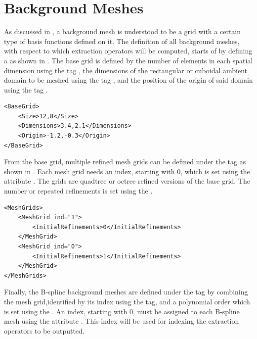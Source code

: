 \section{Background Meshes}
\label{sec:tutorial_background}

As discussed in , a background mesh is understood to be a grid with a certain type of basis functions defined on it. The definition of all background meshes, with respect to which extraction operators will be computed, starts of by defining a  as shown in . The base grid is defined by the number of elements in each spatial dimension using the tag , the dimensions of the rectangular or cuboidal ambient domain to be meshed using the tag , and the position of the origin of said domain using the tag .

\begin{minipage}{\linewidth}
\vspace{0.5cm}
\begin{lstlisting}[caption={Definition of a base grid},captionpos=b, label={lst:base_grid}]
<BaseGrid>
    <Size>12,8</Size>
    <Dimensions>3.4,2.1</Dimensions>
    <Origin>-1.2,-0.3</Origin>
</BaseGrid>
\end{lstlisting}
\end{minipage}

From the base grid, multiple refined mesh grids can be defined under the tag  as shown in . Each mesh grid needs an index, starting with $0$, which is set using the attribute . The grids are quadtree or octree refined versions of the base grid. The number or repeated refinements is set using the .

\begin{minipage}{\linewidth}
\vspace{0.5cm}
\begin{lstlisting}[caption={Definition of a multiple mesh grids},captionpos=b, label={lst:mesh_grids}]
<MeshGrids>
    <MeshGrid ind="1">
        <InitialRefinements>0</InitialRefinements>
    </MeshGrid>
    <MeshGrid ind="0">
        <InitialRefinements>1</InitialRefinements>
    </MeshGrid>
</MeshGrids>
\end{lstlisting}
\end{minipage}

\hypertarget{bspline_mesh_definition}{}
Finally, the B-spline background meshes are defined under the tag  by combining the mesh grid,identified by its index using the  tag, and a polynomial order which is set using the . An index, starting with $0$, must be assigned to each B-spline mesh using the attribute . This index will be used for indexing the extraction operators to be outputted.

